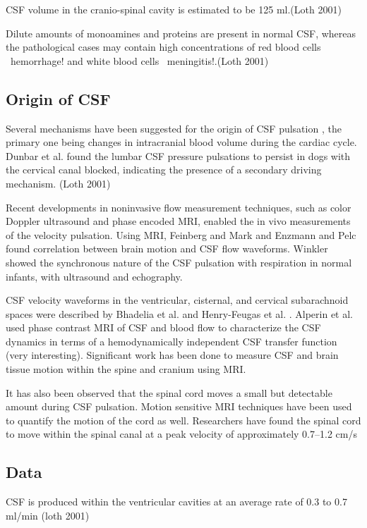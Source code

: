 \documentclass{report}
\begin{document}
CSF volume in the cranio-spinal cavity is estimated
to be 125 ml.(Loth 2001)

Dilute amounts of monoamines and proteins
are present in normal CSF, whereas the pathological cases may
contain high concentrations of red blood cells ~hemorrhage!
and white blood cells ~meningitis!.(Loth 2001)

\subsection{Origin of CSF}
Several mechanisms have been suggested
for the origin of CSF pulsation \cite{bering_circulation_1962} \cite{du_boulay_pulsatile_1966}, the primary one being
changes in intracranial blood volume during the cardiac cycle.
Dunbar et al. \cite{dunbar_study_1966} found the lumbar CSF pressure pulsations to
persist in dogs with the cervical canal blocked, indicating the
presence of a secondary driving mechanism. (Loth 2001)

Recent developments in noninvasive flow measurement techniques,
such as color Doppler ultrasound and phase encoded MRI,
enabled the in vivo measurements of the velocity pulsation. Using
MRI, Feinberg and Mark \cite{feinberg_human_1987} and Enzmann and Pelc \cite{enzmann_cerebrospinal_1993} found
correlation between brain motion and CSF flow waveforms. Winkler
\cite{winkler_cerebrospinal_1994} showed the synchronous nature of the CSF pulsation
with respiration in normal infants, with ultrasound and echography.

CSF velocity waveforms in the ventricular, cisternal, and
cervical subarachnoid spaces were described by Bhadelia et al. \cite{bhadelia_analysis_1995}
and Henry-Feugas et al. \cite{henry-feugeas_temporal_1993}. Alperin et al. \cite{alperin_mri_2005}
used phase contrast MRI of CSF and blood flow to characterize
the CSF dynamics in terms of a hemodynamically independent
CSF transfer function (very interesting). Significant work has been done to measure
CSF and brain tissue motion within the spine and cranium using
MRI.

It has also been observed that the spinal cord moves a small but
detectable amount during CSF pulsation. Motion sensitive MRI
techniques have been used to quantify the motion of the cord as
well. Researchers have found the spinal cord to move within the
spinal canal at a peak velocity of approximately 0.7–1.2 cm/s

\subsection{Data}
CSF is produced within the ventricular cavities at an average rate of 0.3 to 0.7 ml/min (loth 2001)
\end{document}
